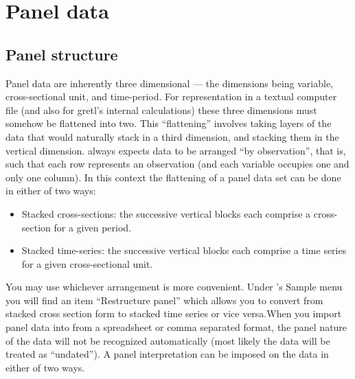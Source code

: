 \chapter{Panel data}
\label{chap-panel}

\section{Panel structure}
\label{panel-structure}

Panel data are inherently three dimensional --- the dimensions being
variable, cross-sectional unit, and time-period.  For representation
in a textual computer file (and also for gretl's internal
calculations) these three dimensions must somehow be flattened into
two.  This ``flattening'' involves taking layers of the data that
would naturally stack in a third dimension, and stacking them in the
vertical dimension. always expects data to be arranged ``by
observation'', that is, such that each row represents an observation
(and each variable occupies one and only one column).  In this context
the flattening of a panel data set can be done in either of two ways:
\begin{itemize}
\item Stacked cross-sections: the successive vertical blocks each
  comprise a cross-section for a given period.
\item Stacked time-series: the successive vertical blocks each
  comprise a time series for a given cross-sectional unit.
\end{itemize}

You may use whichever arrangement is more convenient. Under
's \textsf{Sample} menu you will find an item ``Restructure
panel'' which allows you to convert from stacked cross section form to
stacked time series or vice versa.When you import panel data into
 from a spreadsheet or comma separated format, the panel
nature of the data will not be recognized automatically (most likely
the data will be treated as ``undated'').  A panel interpretation can
be imposed on the data in either of two ways.

